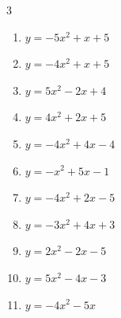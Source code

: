 \begin{multicols}{3}
\begin{enumerate}
  \item $\displaystyle y=-5x^{2}+x+5$


\columnbreak %

  \item $\displaystyle y=-4x^{2}+x+5$


  \item $\displaystyle y=5x^{2}-2x+4$


  \item $\displaystyle y=4x^{2}+2x+5$


  \item $\displaystyle y=-4x^{2}+4x-4$


  \item $\displaystyle y=-x^{2}+5x-1$


\columnbreak %

\resetques

  \item $\displaystyle y=-4x^{2}+2x-5$


  \item $\displaystyle y=-3x^{2}+4x+3$


  \item $\displaystyle y=2x^{2}-2x-5$


  \item $\displaystyle y=5x^{2}-4x-3$


  \item $\displaystyle y=-4x^{2}-5x$


\end{enumerate}
\end{multicols}
